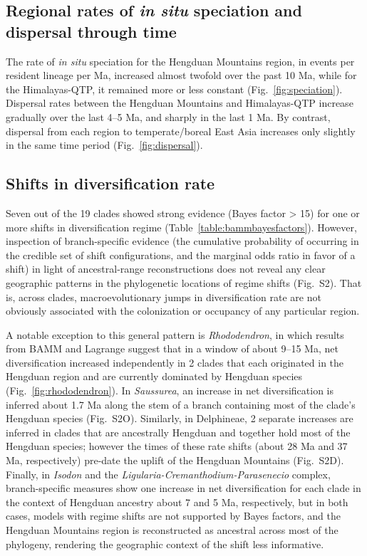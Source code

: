 \subsection*{Regional rates of \textit{in situ} speciation and
  dispersal through time}

The rate of \textit{in situ} speciation for the Hengduan Mountains
region, in events per resident lineage per Ma, increased almost
twofold over the past 10 Ma, while for the Himalayas-QTP, it remained
more or less constant (Fig.~\ref{fig:speciation}). Dispersal rates
between the Hengduan Mountains and Himalayas-QTP increase gradually
over the last 4--5 Ma, and sharply in the last 1 Ma. By contrast,
dispersal from each region to temperate/boreal East Asia increases
only slightly in the same time period (Fig.~\ref{fig:dispersal}).

\subsection*{Shifts in diversification rate}

Seven out of the 19 clades showed strong evidence (Bayes factor > 15)
for one or more shifts in diversification regime
(Table~\ref{table:bammbayesfactors}). However, inspection of
branch-specific evidence (the cumulative probability of occurring in
the credible set of shift configurations, and the marginal odds ratio
in favor of a shift) in light of ancestral-range reconstructions does
not reveal any clear geographic patterns in the phylogenetic locations
of regime shifts (Fig.~S2). That is, across clades, macroevolutionary
jumps in diversification rate are not obviously associated with the
colonization or occupancy of any particular region.

A notable exception to this general pattern is \emph{Rhododendron}, in
which results from BAMM and Lagrange suggest that in a window of about
9--15 Ma, net diversification increased independently in 2 clades that
each originated in the Hengduan region and are currently dominated by
Hengduan species (Fig.~\ref{fig:rhododendron}). In \emph{Saussurea},
an increase in net diversification is inferred about 1.7 Ma along the
stem of a branch containing most of the clade's Hengduan species
(Fig.~S2O). Similarly, in Delphineae, 2 separate increases are
inferred in clades that are ancestrally Hengduan and together hold
most of the Hengduan species; however the times of these rate shifts
(about 28 Ma and 37 Ma, respectively) pre-date the uplift of the
Hengduan Mountains (Fig.~S2D). Finally, in \emph{Isodon} and the
\emph{Ligularia-Cremanthodium-Parasenecio} complex, branch-specific
measures show one increase in net diversification for each clade in
the context of Hengduan ancestry about 7 and 5 Ma, respectively, but
in both cases, models with regime shifts are not supported by Bayes
factors, and the Hengduan Mountains region is reconstructed as
ancestral across most of the phylogeny, rendering the geographic
context of the shift less informative.


